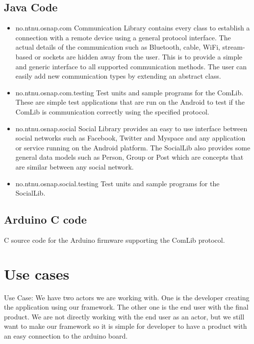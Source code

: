 \subsection{Java Code}
\begin{itemize}
\item{no.ntnu.osnap.com}\newline
Communication Library contains every class to establish a connection with a remote device using a general protocol interface. The actual details of the communication such as
Bluetooth, cable, WiFi, stream-based or sockets are hidden away from the user. This is to provide a simple and generic interface to all supported communication methods. The
user can easily add new communication types by extending an abstract class.
\item{no.ntnu.osnap.com.testing}\newline
Test units and sample programs for the ComLib. These are simple test applications that are run on the Android to test if the ComLib is communication correctly using the specified
protocol.
\item{no.ntnu.osnap.social}\newline
Social Library provides an easy to use interface between social networks such as Facebook, Twitter and Myspace and any application or service running on the Android platform.
The SocialLib also provides some general data models such as Person, Group or Post which are concepts that are similar between any social network. 
\item{no.ntnu.osnap.social.testing}  \newline
Test units and sample programs for the SocialLib.
\end{itemize}

\subsection{Arduino C code}
C source code for the Arduino firmware supporting the ComLib protocol.


\section{Use cases}
Use Case:
We have two actors we are working with. One is the developer creating the application using our framework.
The other one is the end user with the final product. We are not directly working with the end user as an actor,
but we still want to make our framework so it is simple for developer to have a product with an easy connection to the arduino board.

